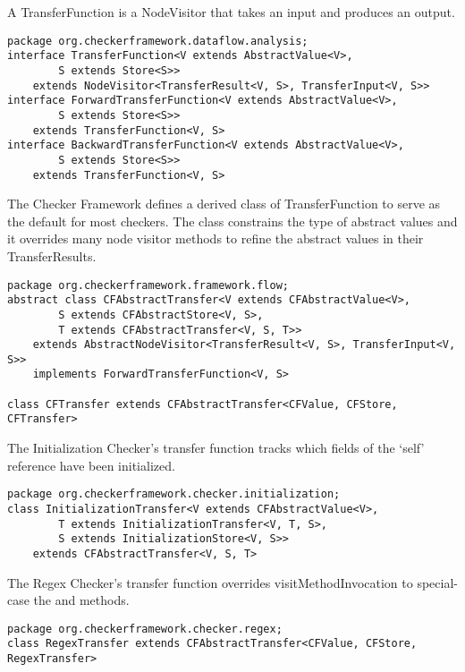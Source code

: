 \label{sec:transfer_function_classes}

A TransferFunction is a NodeVisitor that takes an input and produces an output.

\begin{verbatim}
package org.checkerframework.dataflow.analysis;
interface TransferFunction<V extends AbstractValue<V>,
        S extends Store<S>>
    extends NodeVisitor<TransferResult<V, S>, TransferInput<V, S>>
interface ForwardTransferFunction<V extends AbstractValue<V>,
        S extends Store<S>>
    extends TransferFunction<V, S>
interface BackwardTransferFunction<V extends AbstractValue<V>,
        S extends Store<S>>
    extends TransferFunction<V, S>
\end{verbatim}

The Checker Framework defines a derived class of TransferFunction to
serve as the default for most checkers.  The class constrains the type
of abstract values and it overrides many node visitor methods to
refine the abstract values in their TransferResults.

\begin{verbatim}
package org.checkerframework.framework.flow;
abstract class CFAbstractTransfer<V extends CFAbstractValue<V>,
        S extends CFAbstractStore<V, S>,
        T extends CFAbstractTransfer<V, S, T>>
    extends AbstractNodeVisitor<TransferResult<V, S>, TransferInput<V, S>>
    implements ForwardTransferFunction<V, S>

class CFTransfer extends CFAbstractTransfer<CFValue, CFStore, CFTransfer>
\end{verbatim}

The Initialization Checker's transfer function tracks which fields of
the `self' reference have been initialized.

\begin{verbatim}
package org.checkerframework.checker.initialization;
class InitializationTransfer<V extends CFAbstractValue<V>,
        T extends InitializationTransfer<V, T, S>,
        S extends InitializationStore<V, S>>
    extends CFAbstractTransfer<V, S, T>
\end{verbatim}

The Regex Checker's transfer function overrides visitMethodInvocation
to special-case the  and  methods.

\begin{verbatim}
package org.checkerframework.checker.regex;
class RegexTransfer extends CFAbstractTransfer<CFValue, CFStore, RegexTransfer>
\end{verbatim}


